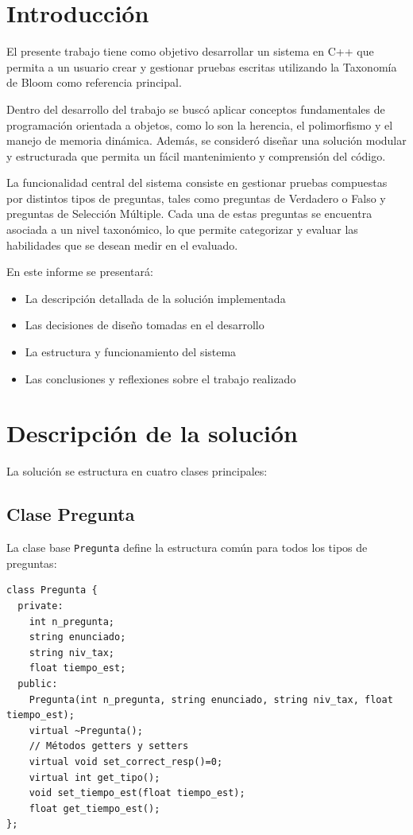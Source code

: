 \documentclass[12pt]{article}
\begin{document}
\section{Introducci\'on}
El presente trabajo tiene como objetivo desarrollar un sistema en C++ que permita a un usuario crear y gestionar pruebas escritas utilizando la Taxonom\'ia de Bloom como referencia principal.

Dentro del desarrollo del trabajo se busc\'o aplicar conceptos fundamentales de programaci\'on orientada a objetos, como lo son la herencia, el polimorfismo y el manejo de memoria din\'amica. Adem\'as, se consider\'o dise\~nar una soluci\'on modular y estructurada que permita un f\'acil mantenimiento y comprensi\'on del c\'odigo.

La funcionalidad central del sistema consiste en gestionar pruebas compuestas por distintos tipos de preguntas, tales como preguntas de Verdadero o Falso y preguntas de Selecci\'on M\'ultiple. Cada una de estas preguntas se encuentra asociada a un nivel taxon\'omico, lo que permite categorizar y evaluar las habilidades que se desean medir en el evaluado.

En este informe se presentar\'a:
\begin{itemize}
    \item La descripci\'on detallada de la soluci\'on implementada
    \item Las decisiones de dise\~no tomadas en el desarrollo
    \item La estructura y funcionamiento del sistema
    \item Las conclusiones y reflexiones sobre el trabajo realizado
\end{itemize}

\section{Descripci\'on de la soluci\'on}
La soluci\'on se estructura en cuatro clases principales:

\subsection{Clase Pregunta}
La clase base \texttt{Pregunta} define la estructura com\'un para todos los tipos de preguntas:

\begin{lstlisting}[style=customc]
class Pregunta {
  private:
    int n_pregunta;
    string enunciado;
    string niv_tax;
    float tiempo_est;
  public:
    Pregunta(int n_pregunta, string enunciado, string niv_tax, float tiempo_est);
    virtual ~Pregunta();
    // Métodos getters y setters
    virtual void set_correct_resp()=0;
    virtual int get_tipo();
    void set_tiempo_est(float tiempo_est);
    float get_tiempo_est();
};
\end{lstlisting}
\end{document}
